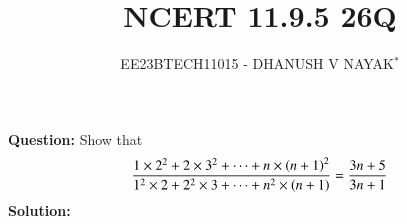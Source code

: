 \documentclass[journal,12pt,twocolumn]{IEEEtran}
\theoremstyle{remark}
\begin{document}

\vspace{3cm}

\title{NCERT 11.9.5 26Q}
\author{EE23BTECH11015 - DHANUSH V NAYAK$^{*}$%
}
\maketitle
\newpage
\bigskip

\renewcommand{\thefigure}{\theenumi}
\renewcommand{\thetable}{\theenumi}


\textbf{Question:} Show that
\begin{align}
    \frac{1\times2^2 + 2\times3^2 + \dots + n\times\left(n+1\right)^{2}}{1^2\times2 + 2^2\times3 + \dots + n^2\times \left(n+1\right)}  = \frac{3n+5}{3n+1}\notag
\end{align}
\textbf{Solution:}

\end{document}
